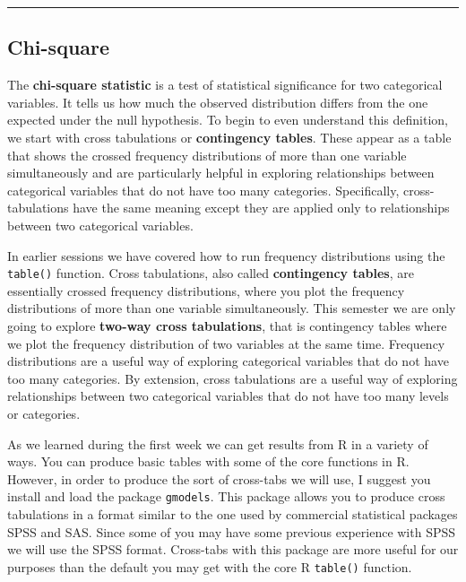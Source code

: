 \documentclass[
]{book}
\begin{document}
\begin{center}\rule{0.5\linewidth}{0.5pt}\end{center}

\hypertarget{chi-square}{%
\subsection{Chi-square}\label{chi-square}}

The \textbf{chi-square statistic} is a test of statistical significance for two categorical variables. It tells us how much the observed distribution differs from the one expected under the null hypothesis. To begin to even understand this definition, we start with cross tabulations or \textbf{contingency tables}. These appear as a table that shows the crossed frequency distributions of more than one variable simultaneously and are particularly helpful in exploring relationships between categorical variables that do not have too many categories. Specifically, cross-tabulations have the same meaning except they are applied only to relationships between two categorical variables.

In earlier sessions we have covered how to run frequency distributions using the \texttt{table()} function. Cross tabulations, also called \textbf{contingency tables}, are essentially crossed frequency distributions, where you plot the frequency distributions of more than one variable simultaneously. This semester we are only going to explore \textbf{two-way cross tabulations}, that is contingency tables where we plot the frequency distribution of two variables at the same time. Frequency distributions are a useful way of exploring categorical variables that do not have too many categories. By extension, cross tabulations are a useful way of exploring relationships between two categorical variables that do not have too many levels or categories.

As we learned during the first week we can get results from R in a variety of ways. You can produce basic tables with some of the core functions in R. However, in order to produce the sort of cross-tabs we will use, I suggest you install and load the package \texttt{gmodels}. This package allows you to produce cross tabulations in a format similar to the one used by commercial statistical packages SPSS and SAS. Since some of you may have some previous experience with SPSS we will use the SPSS format. Cross-tabs with this package are more useful for our purposes than the default you may get with the core R \texttt{table()} function.
\end{document}
